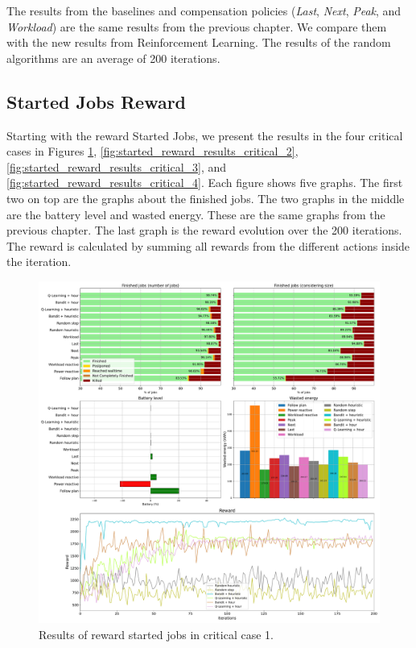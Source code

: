 The results from the baselines and compensation policies (\emph{Last}, \emph{Next}, \emph{Peak}, and \emph{Workload}) are the same results from the previous chapter. We compare them with the new results from Reinforcement Learning. The results of the random algorithms are an average of 200 iterations.

\subsection{Started Jobs Reward}

Starting with the reward Started Jobs, we present the results in the four critical cases in Figures \ref{fig:started_reward_results_critical_1}, \ref{fig:started_reward_results_critical_2}, \ref{fig:started_reward_results_critical_3}, and \ref{fig:started_reward_results_critical_4}. Each figure shows five graphs. The first two on top are the graphs about the finished jobs. The two graphs in the middle are the battery level and wasted energy. These are the same graphs from the previous chapter. The last graph is the reward evolution over the 200 iterations. The reward is calculated by summing all rewards from the different actions inside the iteration.

\begin{figure}[!htb]
    \centering
    \includegraphics[scale=0.29]{Images/Learning_compensations/reward_started_profile_best_workload_1_with_noise_state_delta.pdf}
    \caption{Results of reward started jobs in critical case 1.}
    \label{fig:started_reward_results_critical_1}
\end{figure}

